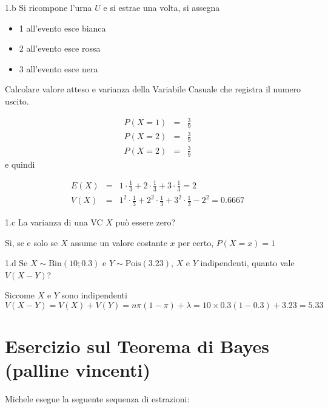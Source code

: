\documentclass[
  11pt,
]{book}
\providecommand{\tightlist}{%
  \setlength{\itemsep}{0pt}\setlength{\parskip}{0pt}}
\theoremstyle{mytheoremstyle}
\theoremstyle{mydefstyle}
\newenvironment{sol}
  {
  \begin{tcolorbox}[enhanced,breakable,arc=0.1mm,boxrule=1pt,colback=white,colframe=iblue,
  title=\bf \fontfamily{lmss}\selectfont \hspace{.5 cm} Soluzione,drop fuzzy shadow]

}{
\end{tcolorbox}
  }
\begin{document}
1.b Si ricompone l'urna \(U\) e si estrae una volta, si assegna

\begin{itemize}
\tightlist
\item
  1 all'evento esce bianca\\
\item
  2 all'evento esce rossa
\item
  3 all'evento esce nera
\end{itemize}

Calcolare valore atteso e varianza della Variabile Casuale che registra il numero uscito.

\begin{sol}
\begin{eqnarray*}
P(X=1)&=& \frac 39\\
P(X=2)&=& \frac 39\\
P(X=2)&=& \frac 39
\end{eqnarray*}
e quindi

\begin{eqnarray*}
E(X)&=& 1\cdot\frac 13 +2\cdot\frac 13 +3\cdot\frac 13 =2\\
V(X)&=& 1^2\cdot\frac 13 +2^2\cdot\frac 13 +3^2\cdot\frac 13 - 2^2=0.6667
\end{eqnarray*}

\end{sol}

1.c La varianza di una VC \(X\) può essere zero?

\begin{sol}
Sì, se e solo se \(X\) assume un valore costante \(x\) per certo, \(P(X=x)=1\)

\end{sol}

1.d Se \(X\sim\text{Bin}(10;0.3)\) e \(Y\sim\text{Pois}(3.23)\),
\(X\) e \(Y\) indipendenti, quanto vale \(V(X-Y)\)?

\begin{sol}
Siccome \(X\) e \(Y\) sono indipendenti
\[
V(X-Y)=V(X)+V(Y)=n\pi(1-\pi)+\lambda=10\times 0.3(1-0.3)+3.23=5.33
\]

\end{sol}

\section{Esercizio sul Teorema di Bayes (palline vincenti)}\label{esercizio-sul-teorema-di-bayes-palline-vincenti}

Michele esegue la seguente sequenza di estrazioni:
\end{document}
